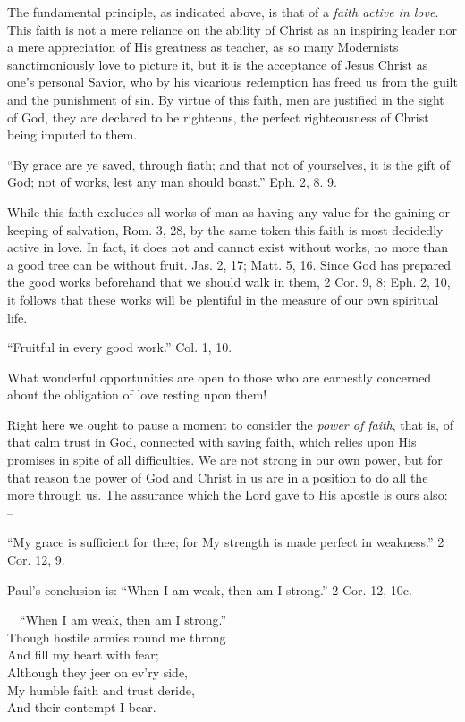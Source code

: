 \documentclass[
]{book}
\begin{document}
The fundamental principle, as indicated above, is that of a \emph{faith active in love}. This faith is not a mere reliance on the ability of Christ as an inspiring leader nor a mere appreciation of His greatness as teacher, as so many Modernists sanctimoniously love to picture it, but it is the acceptance of Jesus Christ as one's personal Savior, who by his vicarious redemption has freed us from the guilt and the punishment of sin. By virtue of this faith, men are justified in the sight of God, they are declared to be righteous, the perfect righteousness of Christ being imputed to them.

``By grace are ye saved, through fiath; and that not of yourselves, it is the gift of God; not of works, lest any man should boast.'' Eph. 2, 8. 9.

While this faith excludes all works of man as having any value for the gaining or keeping of salvation, Rom. 3, 28, by the same token this faith is most decidedly active in love. In fact, it does not and cannot exist without works, no more than a good tree can be without fruit. Jas. 2, 17; Matt. 5, 16. Since God has prepared the good works beforehand that we should walk in them, 2 Cor. 9, 8; Eph. 2, 10, it follows that these works will be plentiful in the measure of our own spiritual life.

``Fruitful in every good work.'' Col. 1, 10.

What wonderful opportunities are open to those who are earnestly concerned about the obligation of love resting upon them!

Right here we ought to pause a moment to consider the \emph{power of faith}, that is, of that calm trust in God, connected with saving faith, which relies upon His promises in spite of all difficulties. We are not strong in our own power, but for that reason the power of God and Christ in us are in a position to do all the more through us. The assurance which the Lord gave to His apostle is ours also: --

``My grace is sufficient for thee; for My strength is made perfect in weakness.'' 2 Cor. 12, 9.

Paul's conclusion is: ``When I am weak, then am I strong.'' 2 Cor. 12, 10c.

~~``When I am weak, then am I strong.''\\
\hspace*{0.333em}\hspace*{0.333em}Though hostile armies round me throng\\
\hspace*{0.333em}\hspace*{0.333em}And fill my heart with fear;\\
\hspace*{0.333em}\hspace*{0.333em}Although they jeer on ev'ry side,\\
\hspace*{0.333em}\hspace*{0.333em}My humble faith and trust deride,\\
\hspace*{0.333em}\hspace*{0.333em}And their contempt I bear.
\end{document}
